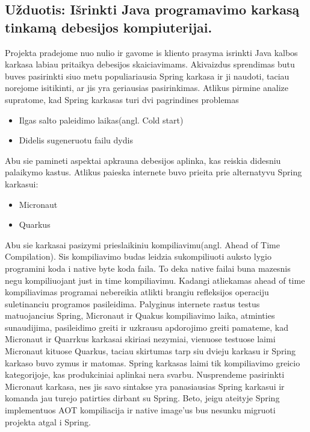 \documentclass{VUMIFPSkursinis}
\begin{document}
	\subsection{Užduotis: Išrinkti Java programavimo karkasą tinkamą debesijos kompiuterijai.}
		Projekta pradejome nuo nulio ir gavome is kliento prasyma isrinkti Java kalbos karkasa labiau pritaikya debesijos skaiciavimams.
		Akivaizdus sprendimas butu buves pasirinkti siuo metu populiariausia Spring karkasa ir ji naudoti, taciau norejome isitikinti, ar jis yra geriausias pasirinkimas.
		Atlikus pirmine analize supratome, kad Spring karkasas turi dvi pagrindines problemas
		\begin{itemize}
			\item{Ilgas salto paleidimo laikas(angl. Cold start)}
			\item{Didelis sugeneruotu failu dydis}
		\end{itemize}
		Abu sie pamineti aspektai apkrauna debesijos aplinka, kas reiskia didesniu palaikymo kastus.
		Atlikus paieska internete buvo prieita prie alternatyvu Spring karkasui:
		\begin{itemize}
			\item{Micronaut}
			\item{Quarkus}
		\end{itemize}
		Abu sie karkasai pasizymi prieslaikiniu kompiliavimu(angl. Ahead of Time Compilation).
		Sis kompiliavimo budas leidzia sukompiliuoti auksto lygio programini koda i native byte koda faila.
		To deka native failai buna mazesnis negu kompiliuojant just in time kompiliavimu.
		Kadangi atliekamas ahead of time kompiliavimas programai nebereikia atlikti brangiu refleksijos operaciju suletinanciu programos pasileidima.
		Palyginus internete rastus testus matuojancius Spring, Micronaut ir Quakus kompiliavimo laika, atminties sunaudijima, pasileidimo greiti ir uzkrausu apdorojimo greiti
		pamateme, kad Micronaut ir Quarrkus karkasai skiriasi nezymiai, vienuose testuose laimi Micronaut kituose Quarkus, taciau skirtumas tarp siu dvieju karkasu ir
		Spring karkaso buvo zymus ir matomas.
		Spring karkasas laimi tik kompiliavimo greicio kategorijoje, kas produkciniai aplinkai nera svarbu.
		Nusprendeme pasirinkti Micronaut karkasa, nes jis savo sintakse yra panasiausias Spring karkasui ir komanda jau turejo patirties dirbant su Spring.
		Beto, jeigu ateityje Spring implementuos AOT kompiliacija ir native image'us bus nesunku migruoti projekta atgal i Spring.
\end{document}

